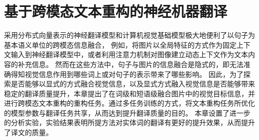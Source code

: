 \chapter{基于跨模态文本重构的神经机器翻译}

% 


采用分布式向量表示的神经翻译模型和计算机视觉基础模型极大地便利了以句子为基本语义单位的跨模态信息融合，
例如，将图片以全局特征的方式作为固定上下文输入到神经翻译模型中，或者利用注意力机制对图像建立动态上下文作为文本内容的补充信息。
然而在这些方法中，句子与图片的信息融合是隐式的，即无法准确得知视觉信息作用到哪些词上或对句子的表示带来了哪些影响。
因此，为了探索是否能够以显式的方式融合视觉信息，以及显式方式融入视觉信息是否能够带来稳定的翻译质量提升，本章提出了在词级和短语级融合图片中的视觉目标信息，并进行跨模态文本重构的重构任务。通过多任务训练的方式，将文本重构任务所优化的模型参数与翻译任务共享，从而达到提升翻译质量的目的。
本章设置了进一步的分析实验，实验结果表明所提方法对实体词的翻译有更好的提升效果，从而提升了译文的质量。

